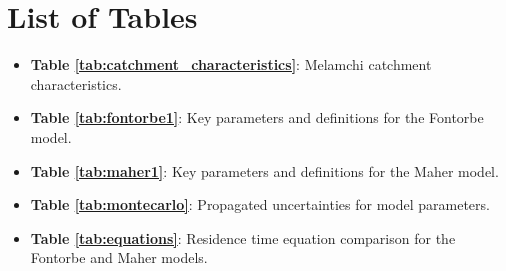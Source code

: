 \documentclass[hidelinks, 12pt]{article} %
\begin{document}
\section*{List of Tables}

{\normalsize

\begin{itemize}[wide]
  \setlength{\itemindent}{-0mm}  %

  \item[] \textbf{Table \ref{tab:catchment_characteristics}}: Melamchi catchment characteristics.
  \item[] \textbf{Table \ref{tab:fontorbe1}}: Key parameters and definitions for the Fontorbe model.
  \item[] \textbf{Table \ref{tab:maher1}}: Key parameters and definitions for the Maher model.
  \item[] \textbf{Table \ref{tab:montecarlo}}: Propagated uncertainties for model parameters.
  \item[] \textbf{Table \ref{tab:equations}}: Residence time equation comparison for the Fontorbe and Maher models.

\end{itemize}

}


\newpage


\FloatBarrier







\newpage




\newpage





\newpage





\newpage





\newpage

\nocite{*}

 
 

\newpage


\end{document}
